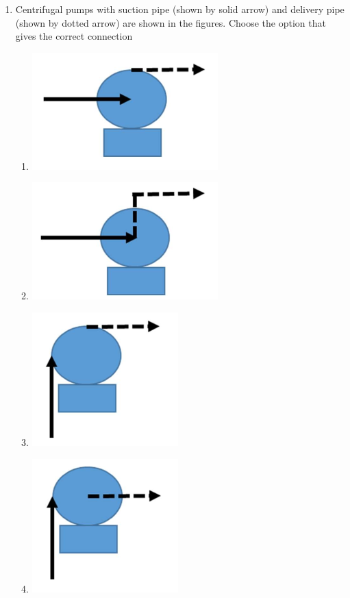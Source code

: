 \documentclass[12pt,a4paper]{article}
\begin{document}
\begin{enumerate}
   \item Centrifugal pumps with suction pipe (shown by solid arrow) and delivery pipe (shown by dotted arrow) are shown in the figures. Choose the option that gives the correct connection
         \begin{enumerate}
            \item \includegraphics[scale=0.4]{o20a}
            \item \includegraphics[scale=0.4]{o20b}
            \item \includegraphics[scale=0.4]{o20c}
            \item \includegraphics[scale=0.4]{o20d}
         \end{enumerate}


\end{enumerate}
\end{document}
